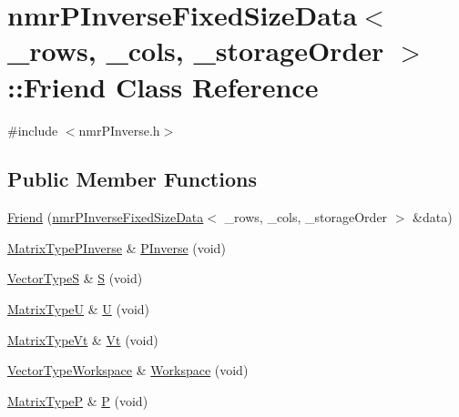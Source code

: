 \hypertarget{classnmr_p_inverse_fixed_size_data_1_1_friend}{}\section{nmr\+P\+Inverse\+Fixed\+Size\+Data$<$ \+\_\+rows, \+\_\+cols, \+\_\+storage\+Order $>$\+:\+:Friend Class Reference}
\label{classnmr_p_inverse_fixed_size_data_1_1_friend}


{\ttfamily \#include $<$nmr\+P\+Inverse.\+h$>$}

\subsection*{Public Member Functions}
\begin{DoxyCompactItemize}
\item 
\hyperlink{classnmr_p_inverse_fixed_size_data_1_1_friend_ab84ac37b92863bfb1ab0e36ef06ca256}{Friend} (\hyperlink{classnmr_p_inverse_fixed_size_data}{nmr\+P\+Inverse\+Fixed\+Size\+Data}$<$ \+\_\+rows, \+\_\+cols, \+\_\+storage\+Order $>$ \&data)
\item 
\hyperlink{classnmr_p_inverse_fixed_size_data_a6c4787ecd9e2e7155fd857fb4427c7b0}{Matrix\+Type\+P\+Inverse} \& \hyperlink{classnmr_p_inverse_fixed_size_data_1_1_friend_a4229fbafa1416c02707d0c58191cff6d}{P\+Inverse} (void)
\item 
\hyperlink{classnmr_p_inverse_fixed_size_data_a55ba424dddf7bd0797b80bc468a209b0}{Vector\+Type\+S} \& \hyperlink{classnmr_p_inverse_fixed_size_data_1_1_friend_a70567ca6c311ff9dd7c094ceb7b960d7}{S} (void)
\item 
\hyperlink{classnmr_p_inverse_fixed_size_data_aef6864d119646cca01fc7a27d9eec4fa}{Matrix\+Type\+U} \& \hyperlink{classnmr_p_inverse_fixed_size_data_1_1_friend_a212ee77c8a20039c4afe9905b191a03c}{U} (void)
\item 
\hyperlink{classnmr_p_inverse_fixed_size_data_a61bc7c8325cf61f5c530759364ce185a}{Matrix\+Type\+Vt} \& \hyperlink{classnmr_p_inverse_fixed_size_data_1_1_friend_aaf7188adc3c6611172d7c21c4658cb83}{Vt} (void)
\item 
\hyperlink{classnmr_p_inverse_fixed_size_data_a801f15c74e8a0884df8cbee5fe0ed052}{Vector\+Type\+Workspace} \& \hyperlink{classnmr_p_inverse_fixed_size_data_1_1_friend_acccd136a3d02a84adf93ffec8da8b2ac}{Workspace} (void)
\item 
\hyperlink{classnmr_p_inverse_fixed_size_data_abbeb86284eb856bc18f108e80906b04d}{Matrix\+Type\+P} \& \hyperlink{classnmr_p_inverse_fixed_size_data_1_1_friend_a57dca191623c0bbf5b8f3bf5be2d2f72}{P} (void)
\end{DoxyCompactItemize}


